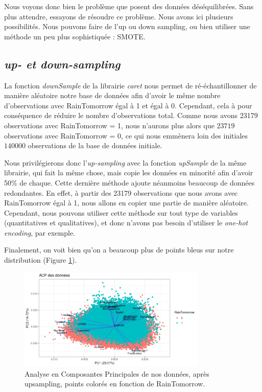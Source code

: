 \documentclass{article}
\begin{document}
Nous voyons donc bien le problème que posent des données déséquilibrées. Sans plus attendre, essayons de résoudre ce problème. Nous avons ici plusieurs possibilités. Nous pouvons faire de l'up ou down sampling, ou bien utiliser une méthode un peu plus sophistiquée : SMOTE.

\subsection{\emph{up- et down-sampling}}

La fonction \emph{downSample} de la librairie \emph{caret} nous permet de ré-échantillonner de manière aléatoire notre base de données afin d'avoir le même nombre d'observations avec RainTomorrow égal à 1 et égal à 0. Cependant, cela à pour conséquence de réduire le nombre d'observations total. Comme nous avons 23179 observations avec RainTomorrow = 1, nous n'aurons plus alors que $23719$ observations avec RainTomorrow = 0, ce qui nous emmènera loin des initiales ~$140000$ observations de la base de données initiale. 

Nous privilégierons donc l'\emph{up-sampling} avec la fonction \emph{upSample} de la même librairie, qui fait la même chose, mais copie les données en minorité afin d'avoir 50\% de chaque. Cette dernière méthode ajoute néanmoins beaucoup de données redondantes. En effet, à partir des 23179 observations que nous avons avec RainTomorrow égal à 1, nous allons en copier une partie de manière aléatoire. Cependant, nous pouvons utiliser cette méthode sur tout type de variables (quantitatives et qualitatives), et donc n'avons pas besoin d'utiliser le \emph{one-hot encoding}, par exemple. 

Finalement, on voit bien qu'on a beaucoup plus de points bleus sur notre distribution (Figure \ref{fig:pca_raintomorrow_up}).

\begin{figure}[htp]
    \centering
    \includegraphics[width=0.8\textwidth]{Images/pca/pca_up.png}
    \caption{Analyse en Composantes Principales de nos données, après upsampling, points colorés en fonction de RainTomorrow.}
    \label{fig:pca_raintomorrow_up}
\end{figure}
\end{document}
